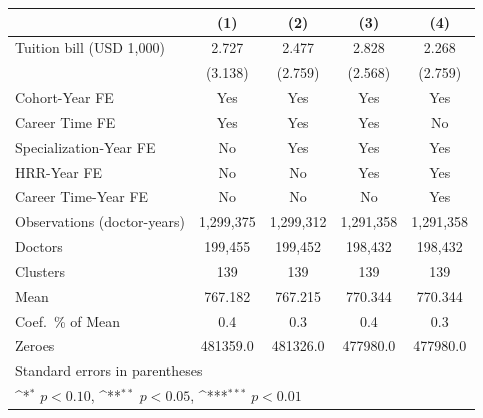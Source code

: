 {
\def\sym#1{\ifmmode^{#1}\else\(^{#1}\)\fi}
\begin{tabular}{l*{4}{c}}
\hline\hline
                    &\multicolumn{1}{c}{(1)}         &\multicolumn{1}{c}{(2)}         &\multicolumn{1}{c}{(3)}         &\multicolumn{1}{c}{(4)}         \\
\hline
Tuition bill (USD 1,000)&       2.727         &       2.477         &       2.828         &       2.268         \\
                    &     (3.138)         &     (2.759)         &     (2.568)         &     (2.759)         \\
[1em]
Cohort-Year FE      &         Yes         &         Yes         &         Yes         &         Yes         \\
[1em]
Career Time FE      &         Yes         &         Yes         &         Yes         &          No         \\
[1em]
Specialization-Year FE&          No         &         Yes         &         Yes         &         Yes         \\
[1em]
HRR-Year FE         &          No         &          No         &         Yes         &         Yes         \\
[1em]
Career Time-Year FE &          No         &          No         &          No         &         Yes         \\
\hline
Observations (doctor-years)&   1,299,375         &   1,299,312         &   1,291,358         &   1,291,358         \\
Doctors             &     199,455         &     199,452         &     198,432         &     198,432         \\
Clusters            &         139         &         139         &         139         &         139         \\
Mean                &     767.182         &     767.215         &     770.344         &     770.344         \\
Coef.\ \% of Mean   &         0.4         &         0.3         &         0.4         &         0.3         \\
Zeroes              &    481359.0         &    481326.0         &    477980.0         &    477980.0         \\
\hline\hline
\multicolumn{5}{l}{\footnotesize Standard errors in parentheses}\\
\multicolumn{5}{l}{\footnotesize \sym{*} \(p<0.10\), \sym{**} \(p<0.05\), \sym{***} \(p<0.01\)}\\
\end{tabular}
}
